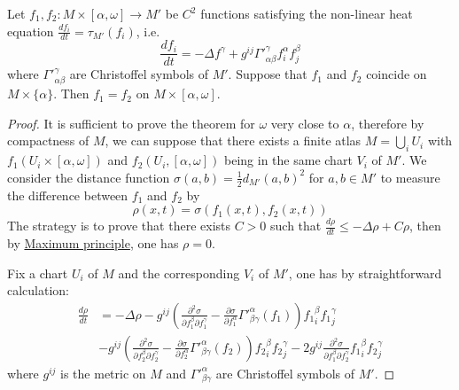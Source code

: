 \begin{theorem}
\label{thm:unique-nonlinear-heat}
Let \(f_1,f_2: M\times [\alpha,\omega] \longrightarrow M'\) be \(C^2\)
functions satisfying the non-linear heat equation
\(\frac{d f_i}{d t} = \tau_{M'}(f_i)\), i.e.
\[
 \frac{d f_i}{d t} =-\Delta f^\gamma +g^{ij}\Gamma'^{\gamma}_{\alpha\beta} f^{\alpha}_{i}f^{\beta}_{j}
\]
where \(\Gamma'^\gamma_{\alpha\beta}\) are Christoffel symbols of \(M'\). Suppose that
\(f_1\) and \(f_2\) coincide on \(M\times \{\alpha\}\). Then \(f_1=f_2\) on \(M\times[\alpha,\omega]\).
\end{theorem}

\begin{proof}
It is sufficient to prove the theorem for \(\omega\) very close to \(\alpha\),
therefore by compactness of \(M\), we can suppose that there exists a finite atlas \(M
= \bigcup_i U_i\) with \(f_1 (U_i\times [\alpha,\omega])\) and \(f_2
(U_i,[\alpha,\omega])\) being in the same chart \(V_i\) of \(M'\). We consider the
distance function \(\sigma(a,b) = \frac{1}{2}d_{M'}(a,b)^2\) for \(a,b\in M'\) to
measure the difference between \(f_1\) and \(f_2\) by 
\[
 \rho(x,t) = \sigma(f_1(x,t), f_2(x,t))
\]
The strategy is to prove that there exists \(C>0\) such that \(\frac{d \rho}{d t} \leq
-\Delta \rho + C\rho\), then by \href{elliptic-parabolic.org}{Maximum principle}, one has \(\rho = 0\).

Fix a chart \(U_i\) of \(M\) and the corresponding \(V_i\) of \(M'\), one has by
straightforward calculation:
\begin{align}
 \frac{d\rho}{d t} &= -\Delta \rho -g^{ij}\left( \frac{\partial^2 \sigma}{\partial
 f_1^\beta \partial f_1^\gamma} - \frac{\partial \sigma}{\partial f_1^\alpha} {\Gamma'}
^{\alpha}_{\beta\gamma}(f_1) \right) {f_1}^\beta_i {f_1}^\gamma_j \nonumber \\
	        &- g^{ij}\left( \frac{\partial^2 \sigma}{\partial
 f_2^\beta \partial f_2^\gamma} - \frac{\partial \sigma}{\partial f_2^\alpha} {\Gamma'}
^{\alpha}_{\beta\gamma}(f_2) \right) {f_2}^\beta_i {f_2}^\gamma_j - 2g^{ij}\frac{\partial^2 \sigma}{\partial f_1^\beta \partial f_2^\gamma} {f_1}^\beta_i {f_2}^\gamma_j  \label{eq:drho-dt}
\end{align}
where \(g^{ij}\) is the metric on \(M\) and \({\Gamma'}^\alpha_{\beta\gamma}\) are
Christoffel symbols of \(M'\). 



\end{proof}

